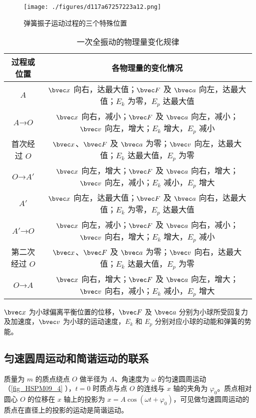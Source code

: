 \begin{figure}[ht]
\centering
\texttt{[image: ./figures/d117a67257223a12.png]}
\caption{弹簧振子运动过程的三个特殊位置} \label{fig_HSPM09_2}
\end{figure}

\begin{table}[ht]
\centering
\caption{一次全振动的物理量变化规律}\label{tab_HSPM09_1}
\begin{tabular}{|c|c|}
\hline
过程或位置 & 各物理量的变化情况 \\
\hline
$A$ & $\bvec x$ 向右，达最大值；$\bvec F$ 及 $\bvec a$ 向左，达最大值；$E_k$ 为零，$E_p$ 达最大值 \\
\hline
$A$→$O$ & $\bvec x$ 向右，减小；$\bvec F$ 及 $\bvec a$ 向左，减小；$\bvec v$ 向左，增大；$E_k$ 增大，$E_p$ 减小 \\
\hline
首次经过 $O$ & $\bvec x$、$\bvec F$ 及 $\bvec a$ 为零；$\bvec v$ 向左，达最大值；$E_k$ 达最大值，$E_p$ 为零 \\
\hline
$O$→$A'$ & $\bvec x$ 向左，增大；$\bvec F$ 及 $\bvec a$ 向右，增大；$\bvec v$ 向左，减小；$E_k$ 减小，$E_p$ 增大 \\
\hline
$A'$ & $\bvec x$ 向左，达最大值；$\bvec F$ 及 $\bvec a$ 向右，达最大值；$E_k$ 为零，$E_p$ 达最大值 \\
\hline
$A'$→$O$ & $\bvec x$ 向左，减小；$\bvec F$ 及 $\bvec a$ 向右，减小；$\bvec v$ 向右，增大；$E_k$ 增大，$E_p$ 减小 \\
\hline
第二次经过 $O$ & $\bvec x$、$\bvec F$ 及 $\bvec a$ 为零；$\bvec v$ 向右，达最大值；$E_k$ 达最大值，$E_p$ 为零 \\
\hline
$O$→$A$ & $\bvec x$ 向右，增大；$\bvec F$ 及 $\bvec a$ 向左，增大；$\bvec v$ 向右，减小；$E_k$ 减小，$E_p$ 增大 \\
\hline
\end{tabular}
\end{table}
$\bvec x$ 为小球偏离平衡位置的位移，$\bvec F$ 及 $\bvec a$ 分别为小球所受回复力及加速度，$\bvec v$ 为小球的运动速度，$E_k$ 和 $E_p$ 分别对应小球的动能和弹簧的势能。

\subsection{匀速圆周运动和简谐运动的联系}

质量为 $m$ 的质点绕点 $O$ 做半径为 $A$、角速度为 $\omega$ 的匀速圆周运动（\autoref{fig_HSPM09_4} ），$t=0$ 时质点与点 $O$ 的连线与 $x$ 轴的夹角为 $\varphi_0$。质点相对圆心 $O$ 的位移在 $x$ 轴上的投影为 $x=A\cos(\omega t + \varphi_0)$，可见做匀速圆周运动的质点在直径上的投影的运动是简谐运动。

